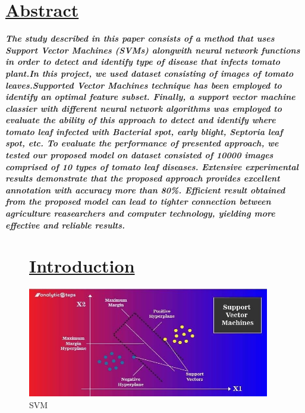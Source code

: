 \documentclass[12pt,a4paper, oneside]{article}
\begin{document}
  
\restoregeometry%
\section{\underline{Abstract}}
\textbf{\emph{The study described in this paper consists of a method that uses Support Vector Machines (SVMs) alongwith neural network functions in order to detect and identify type of disease that infects tomato plant.In this project, we used dataset consisting of images of tomato leaves.Supported Vector Machines technique has been employed to identify an optimal feature subset. Finally, a support vector machine classier with different neural network algorithms was employed to evaluate the ability of this approach to detect and identify where tomato leaf infected with Bacterial spot, early blight, Septoria leaf spot, etc. To evaluate the performance of presented approach, we tested our proposed model on dataset consisted of 10000 images comprised of 10 types of tomato leaf diseases. Extensive experimental results demonstrate that the proposed approach provides excellent annotation with accuracy more than 80\%. Efficient result obtained from the proposed model can lead to tighter connection between agriculture reasearchers and computer technology, yielding more effective and reliable results.
}}

\newpage



\begin{figure}
\section{\underline{Introduction}}

    
    \begin{center}
    \includegraphics[width=400]{images/intro.jpg}
    \caption{SVM}
\end{center}
\end{figure}
\end{document}
